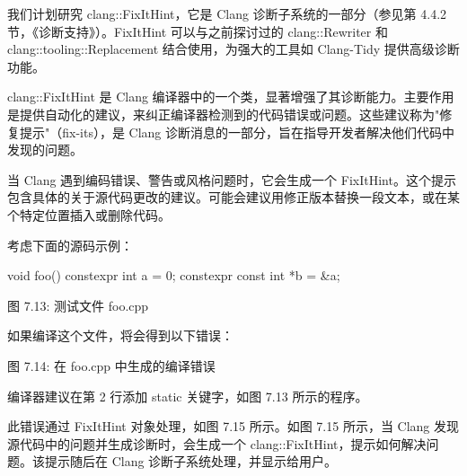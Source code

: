 我们计划研究 clang::FixItHint，它是 Clang 诊断子系统的一部分（参见第 4.4.2 节，《诊断支持》）。FixItHint 可以与之前探讨过的 clang::Rewriter 和 clang::tooling::Replacement 结合使用，为强大的工具如 Clang-Tidy 提供高级诊断功能。


clang::FixItHint 是 Clang 编译器中的一个类，显著增强了其诊断能力。主要作用是提供自动化的建议，来纠正编译器检测到的代码错误或问题。这些建议称为"修复提示"（fix-its），是 Clang 诊断消息的一部分，旨在指导开发者解决他们代码中发现的问题。

当 Clang 遇到编码错误、警告或风格问题时，它会生成一个 FixItHint。这个提示包含具体的关于源代码更改的建议。可能会建议用修正版本替换一段文本，或在某个特定位置插入或删除代码。

考虑下面的源码示例：

\begin{cpp}
void foo() {
  constexpr int a = 0;
  constexpr const int *b = &a;
}
\end{cpp}

\begin{center}
图 7.13: 测试文件 foo.cpp
\end{center}

如果编译这个文件，将会得到以下错误：


\begin{center}
图 7.14: 在 foo.cpp 中生成的编译错误
\end{center}

编译器建议在第 2 行添加 static 关键字，如图 7.13 所示的程序。

此错误通过 FixItHint 对象处理，如图 7.15 所示。如图 7.15 所示，当 Clang 发现源代码中的问题并生成诊断时，会生成一个 clang::FixItHint，提示如何解决问题。该提示随后在 Clang 诊断子系统处理，并显示给用户。

